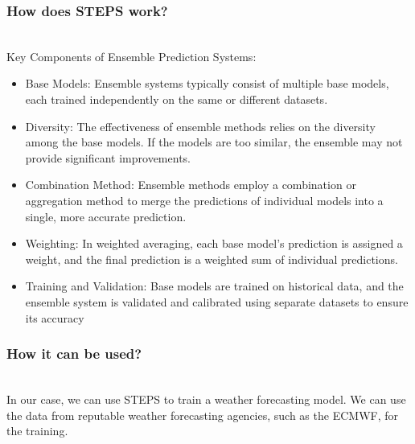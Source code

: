 \documentclass[../paper.tex]{subfiles}
\begin{document}
    \subsubsection{How does STEPS work?}
        \hfill\\
        Key Components of Ensemble Prediction Systems:
        \begin{itemize}
            \item Base Models: Ensemble systems typically consist of multiple base models,
            each trained independently on the same or different datasets.

            \item Diversity: The effectiveness of ensemble methods relies on the diversity among the base models.
            If the models are too similar, the ensemble may not provide significant improvements.

            \item Combination Method:
            Ensemble methods employ a combination or aggregation method
            to merge the predictions of individual models into a single,
            more accurate prediction.

            \item Weighting: In weighted averaging, each base model's prediction is assigned a weight,
            and the final prediction is a weighted sum of individual predictions.

            \item Training and Validation: Base models are trained on historical data,
            and the ensemble system is validated and calibrated
            using separate datasets to ensure its accuracy
        \end{itemize}

    \subsubsection{How it can be used?}
        \hfill\\
        In our case, we can use STEPS to train a weather forecasting model.
        We can use the data from reputable weather forecasting agencies, such as the ECMWF, for the training.
\end{document}

